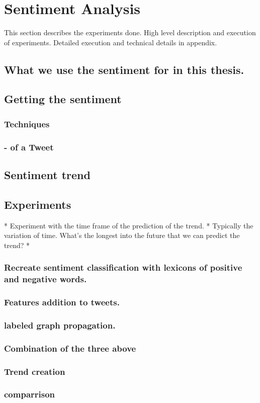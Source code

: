 
\chapter{Sentiment Analysis}
This section describes the experiments done. High level description and
execution of experiments. Detailed execution and technical details in appendix. 

\section{What we use the sentiment for in this thesis.}
\section{Getting the sentiment}
\subsection{Techniques}
\subsection{- of a Tweet}
\section{Sentiment trend}
\section{Experiments}

* Experiment with the time frame of the prediction of the trend. 
	* Typically the variation of time. What's the longest into the future that
we can predict the trend?
* 

\subsection{Recreate sentiment classification with lexicons of positive and
negative words.}
\subsection{Features addition to tweets.}
\subsection{labeled graph propagation.}
\subsection{Combination of the three above}
\subsection{Trend creation}
\subsection{comparrison}
